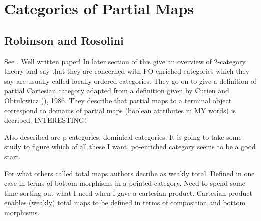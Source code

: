 \documentclass[14pt,a4paper]{scrartcl}
\begin{document}
\section{Categories of Partial Maps}
\subsection{Robinson and Rosolini}
See \cite{robinson1988}.
Well written paper!
In later section of this give an overview of 2-category theory and say that they are concerned with 
PO-enriched categories which they say are usually called locally ordered categories.
They go on to give a definition of partial Cartesian category  adapted from a definition given by Curien and Obtulowicz
(\cite{curien1986}),
1986. They describe that partial maps to a terminal object correspond to domains of partial maps (boolean attributes in MY words) is decribed. INTERESTING!

Also described are p-categories, dominical categories. It is going to take some study to figure which of all these I want.
po-enriched category seems to be a good start. 

For what others called total maps authors decribe as weakly total. Defined in one case in 
terms of bottom morphisms in a pointed category. Need to spend some time sorting out what I need when i gave a cartesian product. Cartesian product enables (weakly) total maps to be defined in terms of composition and bottom morphisms. 
  

\end{document}

